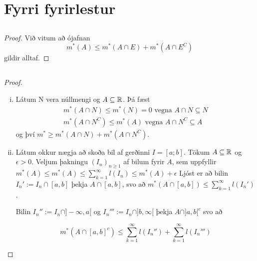 \documentclass[12pt]{book}
\begin{document}
\section{Fyrri fyrirlestur}
\subsection{}
\begin{proof}
  Við vitum að ójafnan \[m^*(A) \leq m^*(A \cap E) + m^*(A \cap E^C) \]
  gildir alltaf.
  
\end{proof}

\subsection{}
\begin{proof}
  \begin{enumerate}[(i)]
  \item  Látum N vera núllmengi og $A \subseteq \mathbb{R}$. Þá fæst
    \begin{gather*}
      m^*(A\cap N) \leq m^*(N) = 0 \text{ vegna } A \cap N \subseteq N \\
      m^*(A \cap N^C) \leq m^*(A) \text{ vegna } A \cap N^C \subseteq A
    \end{gather*}
    og því $m^* \geq m^*(A \cap N) + m^*(A\cap N^C)$.


  \item Látum okkur nægja að skoða bil af gerðinni $I = [a;b]$. Tökum $A \subseteq \mathbb{R}$
    og $\epsilon > 0$. Veljum þakningu $(I_n)_{n\geq 1}$ af bilum fyrir $A$,
    sem uppfyllir $m^*(A) \leq m^*(A) \leq \sum_{k=1}^{\infty} l(I_n) \leq m^*(A) + \epsilon$
    Ljóst er að bilin $I_n' := I_n \cap [a,b]$ þekja $A \cap [a,b]$, svo að
    $m^*(A \cap [a,b]) \leq \sum_{k=1}^{\infty} l(I_n')$.

    Bilin $I_n'' := I_n \cap ]- \infty, a[$ og $I_n''' := I_n \cap ]b, \infty [ $
    þekja  $A \cap ]a,b[^c$ svo að

\[ m^*(A \cap [a,b]^c) \leq \sum_{k=1}^{\infty} l(I_n'') + \sum_{k=1}^{\infty} l(I_n''') \]
  \end{enumerate}
  
\end{proof}

\subsection{}
\end{document}
